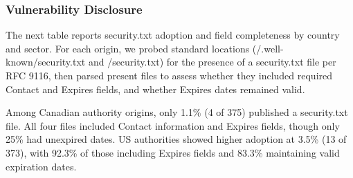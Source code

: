 \documentclass[pdflatex,sn-mathphys-num]{sn-jnl}
\newlength{\inlinecapskip}
\newenvironment{inlinecap}[1][\textwidth]
  {\par\vspace{\inlinecapskip}\noindent\begin{minipage}{#1}\centering}
  {\end{minipage}\par\vspace{\inlinecapskip}}
\numberwithin{equation}{section}
\theoremstyle{thmstyleone}
\theoremstyle{thmstyletwo}%
\theoremstyle{thmstylethree}%
\begin{document}
\subsubsection{Vulnerability Disclosure}

\vspace{1em}The next table reports security.txt adoption and field completeness by country and sector. For each origin, we probed standard locations 
(/.well-known/security.txt and /security.txt) for the presence of a security.txt 
file per RFC 9116, then parsed present files to assess whether they included required Contact and Expires fields, and 
whether Expires dates remained valid.

\begin{inlinecap}
\label{tab:securitytxt_summary}
\centering
\small
\setlength{\tabcolsep}{3pt}
%
\end{inlinecap}

Among Canadian authority origins, only 1.1\% (4 of 375) 
published a security.txt file. All four files included Contact information and Expires fields, 
though only 25\% had unexpired dates. US authorities showed higher adoption at 3.5\% (13 of 373), 
with 92.3\% of those including Expires fields and 83.3\% maintaining valid expiration dates. 

\end{document}
